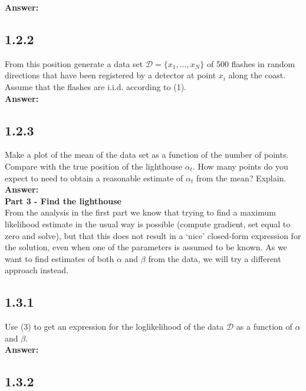 \documentclass[a4paper]{article}
\begin{document}
\textbf{Answer:}\\


\subsection*{1.2.2}

From this position generate a data set $\mathcal{D} = \{ x_1,..., x_N \}$ of 500 flashes in random directions that have been registered by a detector at point $x_i$ along the coast. Assume that the flashes are i.i.d. according to (1).\\

\textbf{Answer:}\\


\subsection*{1.2.3}

Make a plot of the mean of the data set as a function of the number of points. Compare with the true position of the lighthouse $\alpha_t$. How many points do you expect to need to obtain a reasonable estimate of $\alpha_t$ from the mean? Explain.\\

\textbf{Answer:}\\



\textbf{Part 3 - Find the lighthouse}\\

From the analysis in the first part we know that trying to find a maximum likelihood estimate in the usual way is possible (compute gradient, set equal to zero and solve), but that this does not result in a ‘nice’ closed-form expression for the solution, even when one of the parameters is assumed to be known. As we want to find estimates of both $\alpha$ and $\beta$ from the data, we will try a different approach instead.

\subsection*{1.3.1}

Use (3) to get an expression for the loglikelihood of the data $\mathcal{D}$ as a function of $\alpha$ and $\beta$.\\

\textbf{Answer:}\\


\subsection*{1.3.2}
\end{document}
